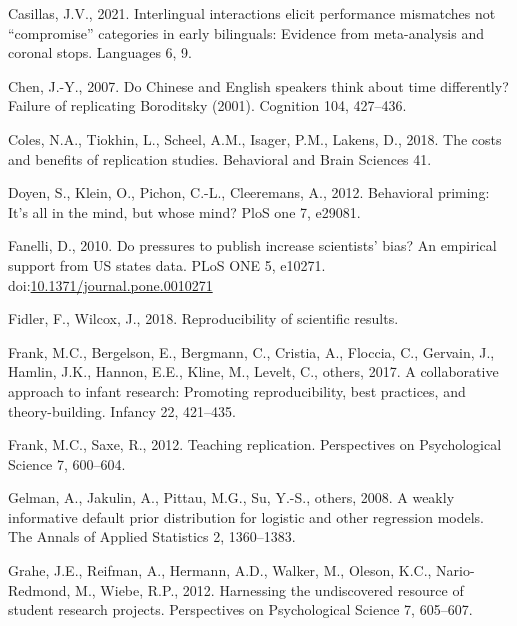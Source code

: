 \documentclass[]{elsarticle} %
\newlength{\cslhangindent}
\newlength{\cslentryspacingunit} %
\newenvironment{CSLReferences}[2] %
 {%
  \setlength{\parindent}{0pt}
  \ifodd #1
  \let\oldpar\par
  \def\par{\hangindent=\cslhangindent\oldpar}
  \fi
  \setlength{\parskip}{#2\cslentryspacingunit}
 }%
 {}
\begin{document}
\begin{CSLReferences}{1}{0}
\leavevmode\hypertarget{ref-casillas2021interlingual}{}%
Casillas, J.V., 2021. Interlingual interactions elicit performance mismatches not {``compromise''} categories in early bilinguals: Evidence from meta-analysis and coronal stops. Languages 6, 9.

\leavevmode\hypertarget{ref-chen_chinese_2007}{}%
Chen, J.-Y., 2007. Do {Chinese} and {English} speakers think about time differently? {Failure} of replicating {Boroditsky} (2001). Cognition 104, 427--436.

\leavevmode\hypertarget{ref-coles2018costs}{}%
Coles, N.A., Tiokhin, L., Scheel, A.M., Isager, P.M., Lakens, D., 2018. The costs and benefits of replication studies. Behavioral and Brain Sciences 41.

\leavevmode\hypertarget{ref-doyen_behavioral_2012}{}%
Doyen, S., Klein, O., Pichon, C.-L., Cleeremans, A., 2012. Behavioral priming: It's all in the mind, but whose mind? PloS one 7, e29081.

\leavevmode\hypertarget{ref-fanelli_pressures_2010}{}%
Fanelli, D., 2010. Do pressures to publish increase scientists' bias? An empirical support from US states data. PLoS ONE 5, e10271. doi:\href{https://doi.org/10.1371/journal.pone.0010271}{10.1371/journal.pone.0010271}

\leavevmode\hypertarget{ref-fidler_reproducibility_2018}{}%
Fidler, F., Wilcox, J., 2018. Reproducibility of scientific results.

\leavevmode\hypertarget{ref-frank2017collaborative}{}%
Frank, M.C., Bergelson, E., Bergmann, C., Cristia, A., Floccia, C., Gervain, J., Hamlin, J.K., Hannon, E.E., Kline, M., Levelt, C., others, 2017. A collaborative approach to infant research: Promoting reproducibility, best practices, and theory-building. Infancy 22, 421--435.

\leavevmode\hypertarget{ref-frank2012teaching}{}%
Frank, M.C., Saxe, R., 2012. Teaching replication. Perspectives on Psychological Science 7, 600--604.

\leavevmode\hypertarget{ref-gelman_weakly_2008}{}%
Gelman, A., Jakulin, A., Pittau, M.G., Su, Y.-S., others, 2008. A weakly informative default prior distribution for logistic and other regression models. The Annals of Applied Statistics 2, 1360--1383.

\leavevmode\hypertarget{ref-grahe2012harnessing}{}%
Grahe, J.E., Reifman, A., Hermann, A.D., Walker, M., Oleson, K.C., Nario-Redmond, M., Wiebe, R.P., 2012. Harnessing the undiscovered resource of student research projects. Perspectives on Psychological Science 7, 605--607.


\end{CSLReferences}
\end{document}
